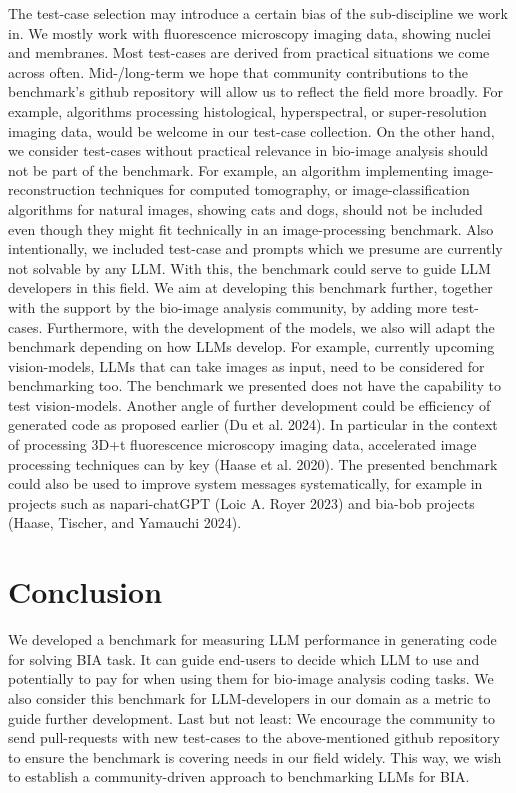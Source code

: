 \documentclass{ecai}
\begin{document}
The test-case selection may introduce a certain bias of the sub-discipline we work in. We mostly work with fluorescence microscopy imaging data, showing nuclei and membranes. Most test-cases are derived from practical situations we come across often. Mid-/long-term we hope that community contributions to the benchmark’s github repository will allow us to reflect the field more broadly. For example, algorithms processing histological, hyperspectral, or super-resolution imaging data, would be welcome in our test-case collection. On the other hand, we consider test-cases without practical relevance in bio-image analysis should not be part of the benchmark. For example, an algorithm implementing image-reconstruction techniques for computed tomography, or image-classification algorithms for natural images, showing cats and dogs, should not be included even though they might fit technically in an image-processing benchmark. Also intentionally, we included test-case and prompts which we presume are currently not solvable by any LLM. With this, the benchmark could serve to guide LLM developers in this field.
We aim at developing this benchmark further, together with the support by the bio-image analysis community, by adding more test-cases. Furthermore, with the development of the models, we also will adapt the benchmark depending on how LLMs develop. For example, currently upcoming vision-models, LLMs that can take images as input, need to be considered for benchmarking too. The benchmark we presented does not have the capability to test vision-models. Another angle of further development could be efficiency of generated code as proposed earlier (Du et al. 2024). In particular in the context of processing 3D+t fluorescence microscopy imaging data, accelerated image processing techniques can by key (Haase et al. 2020). The presented benchmark could also be used to improve system messages systematically, for example in projects such as napari-chatGPT (Loic A. Royer 2023) and bia-bob projects (Haase, Tischer, and Yamauchi 2024).


\section{Conclusion}

We developed a benchmark for measuring LLM performance in generating code for solving BIA task. It can guide end-users to decide which LLM to use and potentially to pay for when using them for bio-image analysis coding tasks. We also consider this benchmark for LLM-developers in our domain as a metric to guide further development. Last but not least: We encourage the community to send pull-requests with new test-cases to the above-mentioned github repository to ensure the benchmark is covering needs in our field widely. This way, we wish to establish a community-driven approach to benchmarking LLMs for BIA. 
\end{document}
